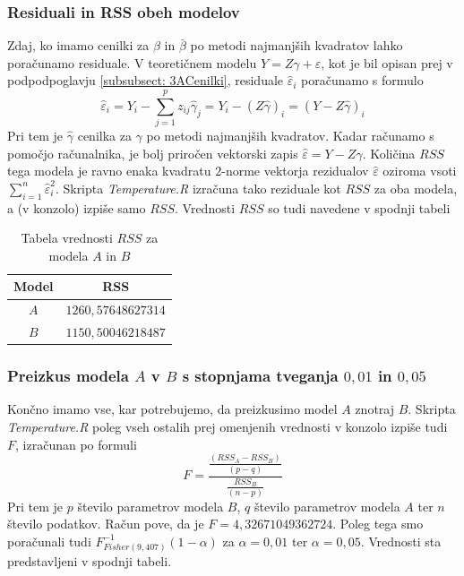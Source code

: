\documentclass[a4paper, 10pt]{article}
\begin{document}
	\subsubsection{Residuali in RSS obeh modelov}\label{subsubsect: 3AResiduali}
	Zdaj, ko imamo cenilki za $\beta$ in $\bar{\beta}$ po metodi najmanjših kvadratov lahko poračunamo residuale. V teoretičnem modelu $Y = Z\gamma + \varepsilon$, kot je bil opisan prej v podpodpoglavju \ref{subsubsect: 3ACenilki}, residuale $\widehat{\varepsilon}_i$ poračunamo s formulo $$\widehat{\varepsilon}_i = Y_i - \sum_{j = 1}^{p}z_{ij}\widehat{\gamma}_j = Y_i - (Z\widehat{\gamma})_i = (Y - Z\widehat{\gamma})_i$$ Pri tem je $\widehat{\gamma}$ cenilka za $\gamma$ po metodi najmanjših kvadratov. Kadar računamo s pomočjo računalnika, je bolj priročen vektorski zapis $\widehat{\varepsilon} = Y - Z\widehat{\gamma}$. Količina $RSS$ tega modela je ravno enaka kvadratu $2$-norme vektorja rezidualov $\widehat{\varepsilon}$ oziroma vsoti $\sum_{i = 1}^{n}\widehat{\varepsilon}_i^2$. Skripta \textit{Temperature.R} izračuna tako reziduale kot $RSS$ za oba modela, a (v konzolo) izpiše samo $RSS$. Vrednosti $RSS$ so tudi navedene v spodnji tabeli
	
	\begin{table}[h!]
		\centering
		\begin{tabular}{| c | c |}
			\hline
			Model & RSS \\ \hline
			$A$ & $1260{,}57648627314$ \\ \hline
			$B$ & $1150{,}50046218487$ \\ \hline
		\end{tabular}
		\caption{Tabela vrednosti $RSS$ za modela $A$ in $B$}
	\end{table}
	
	\subsubsection{Preizkus modela $A$ v $B$ s stopnjama tveganja $0{,}01$ in $0{,}05$}\label{subsubsect: 3APreizkus}
		Končno imamo vse, kar potrebujemo, da preizkusimo model $A$ znotraj $B$. Skripta \textit{Temperature.R} poleg vseh ostalih prej omenjenih vrednosti v konzolo izpiše tudi $F$, izračunan po formuli $$F = \frac{\frac{(RSS_A - RSS_B)}{(p-q)}}{\frac{RSS_B}{(n - p)}}$$ Pri tem je $p$ število parametrov modela $B$, $q$ število parametrov modela $A$ ter $n$ število podatkov. Račun pove, da je $F = 4{,}32671049362724$. Poleg tega smo poračunali tudi $F_{Fisher(9, 407)}^{-1}(1-\alpha)$ za $\alpha = 0{,}01$ ter $\alpha = 0{,}05$. Vrednosti sta predstavljeni v spodnji tabeli.
		
\end{document}
